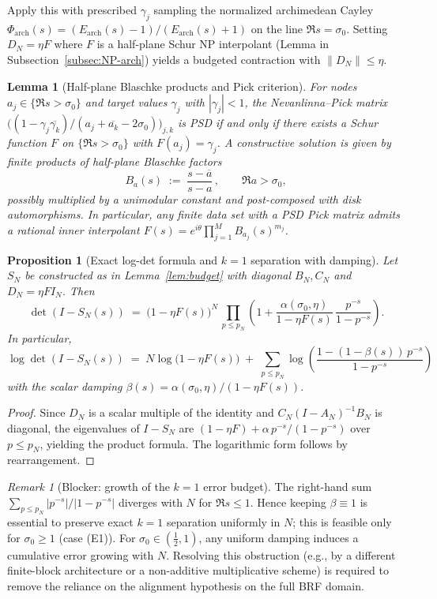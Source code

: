 \documentclass[11pt]{article}
\newtheorem{proposition}[theorem]{Proposition}
\newtheorem{lemma}[theorem]{Lemma}
\theoremstyle{definition}
\theoremstyle{remark}
\newtheorem{remark}[theorem]{Remark}
\begin{document}
Apply this with prescribed $\gamma_j$ sampling the normalized archimedean Cayley $\Phi_{\mathrm{arch}}(s)=(E_{\mathrm{arch}}(s)-1)/(E_{\mathrm{arch}}(s)+1)$ on the line $\Re s=\sigma_0$. Setting $D_N=\eta F$ where $F$ is a half-plane Schur NP interpolant (Lemma in Subsection~\ref{subsec:NP-arch}) yields a budgeted contraction with $\|D_N\|\le \eta$.

\begin{lemma}[Half-plane Blaschke products and Pick criterion]\label{lem:halfplane-blaschke}
For nodes $a_j\in\{\Re s>\sigma_0\}$ and target values $\gamma_j$ with $|\gamma_j|<1$, the Nevanlinna--Pick matrix $\big((1-\gamma_j\overline{\gamma_k})/(a_j+\overline{a_k}-2\sigma_0)\big)_{j,k}$ is PSD if and only if there exists a Schur function $F$ on $\{\Re s>\sigma_0\}$ with $F(a_j)=\gamma_j$. A constructive solution is given by finite products of half-plane Blaschke factors
\[
 B_{a}(s)\;:=\;\frac{s-\overline a}{s-a}\,,\qquad \Re a>\sigma_0,
\]
possibly multiplied by a unimodular constant and post-composed with disk automorphisms. In particular, any finite data set with a PSD Pick matrix admits a rational inner interpolant $F(s)=e^{i\theta}\prod_{j=1}^{M} B_{a_j}(s)^{m_j}$.
\end{lemma}


\begin{proposition}[Exact log-det formula and $k=1$ separation with damping]\label{prop:logdet-S}
Let $S_N$ be constructed as in Lemma~\ref{lem:budget} with diagonal $B_N,C_N$ and $D_N=\eta F I_N$. Then
\[
 \det(I-S_N(s))\;=\;\big(1-\eta F(s)\big)^{N}\,\prod_{p\le p_N}\left(1+\frac{\alpha(\sigma_0,\eta)}{1-\eta F(s)}\,\frac{p^{-s}}{1-p^{-s}}\right).
\]
In particular,
\[
 \log\det(I-S_N(s))\;=\;N\log\big(1-\eta F(s)\big)\; +\; \sum_{p\le p_N}\log\left(\frac{1-(1-\beta(s))\,p^{-s}}{1-p^{-s}}\right)
\]
with the scalar damping $\beta(s)=\alpha(\sigma_0,\eta)/(1-\eta F(s))$.
\end{proposition}
\begin{proof}
Since $D_N$ is a scalar multiple of the identity and $C_N(I-A_N)^{-1}B_N$ is diagonal, the eigenvalues of $I-S_N$ are $(1-\eta F)+\alpha\, p^{-s}/(1-p^{-s})$ over $p\le p_N$, yielding the product formula. The logarithmic form follows by rearrangement.
\end{proof}

\begin{remark}[Blocker: growth of the $k=1$ error budget]
The right-hand sum $\sum_{p\le p_N} |p^{-s}|/|1-p^{-s}|$ diverges with $N$ for $\Re s\le 1$. Hence keeping $\beta\equiv 1$ is essential to preserve exact $k=1$ separation uniformly in $N$; this is feasible only for $\sigma_0\ge 1$ (case (E1)). For $\sigma_0\in(\tfrac12,1)$, any uniform damping induces a cumulative error growing with $N$. Resolving this obstruction (e.g., by a different finite-block architecture or a non-additive multiplicative scheme) is required to remove the reliance on the alignment hypothesis on the full BRF domain.
\end{remark}
\end{document}
